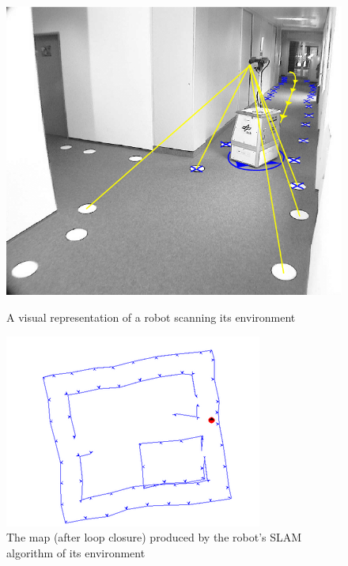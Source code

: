 \documentclass[12pt]{article}
\begin{document}
\begin{figure}[h]
    \centering
    \begin{minipage}{0.45\textwidth}
        \centering
        \includegraphics[width=\linewidth]{SLAM_agent} %
        \caption[Short caption]{A visual representation of a robot scanning its environment \cite{SLAM_overview}}
        \label{fig:SLAM_agent}
    \end{minipage}\hfill
    \begin{minipage}{0.45\textwidth}
        \centering
        \includegraphics[width=\linewidth]{SLAM_map} %
        \caption[Short caption]{The map (after loop closure) produced by the robot's SLAM algorithm of its environment \cite{SLAM_overview}}
        \label{fig:SLAM_map}
    \end{minipage}
\end{figure}
\end{document}
